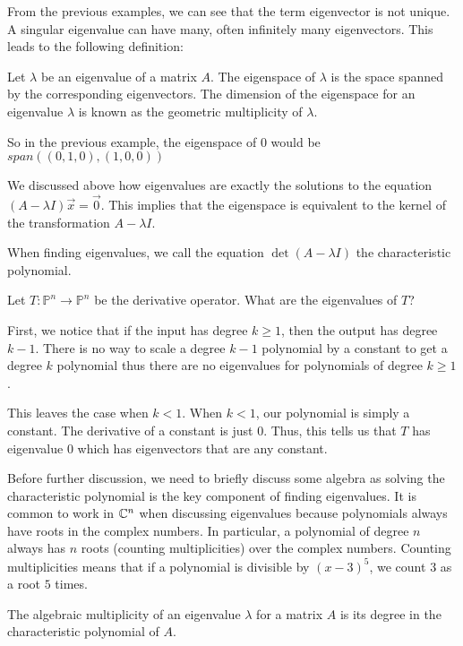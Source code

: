 From the previous examples, we can see that the term eigenvector is not unique. A singular eigenvalue can have many, often infinitely many eigenvectors. This leads to the following definition:
\begin{definition}
    Let $\lambda$ be an eigenvalue of a matrix $A$. The eigenspace of $\lambda$ is the space spanned by the corresponding eigenvectors. The dimension of the eigenspace for an eigenvalue $\lambda$ is known as the geometric multiplicity of $\lambda$.
\end{definition}
\begin{remark}
    So in the previous example, the eigenspace of $0$ would be $span({(0,1,0),(1,0,0)})$
\end{remark}
\begin{remark}
    We discussed above how eigenvalues are exactly the solutions to the equation $(A-\lambda I)\vec{x}=\vec{0}$. This implies that the eigenspace is equivalent to the kernel of the transformation $A-\lambda I$.
\end{remark}
\begin{definition}
    When finding eigenvalues, we call the equation $\det(A-\lambda I)$ the characteristic polynomial.
\end{definition}
\begin{example}
    Let $T: \mathbb{P}^n\to\mathbb{P}^n$ be the derivative operator. What are the eigenvalues of $T$?

    First, we notice that if the input has degree $k\geq 1$, then the output has degree $k-1$. There is no way to scale a degree $k-1$ polynomial by a constant to get a degree $k$ polynomial thus there are no eigenvalues for polynomials of degree $k\geq 1$.

    This leaves the case when $k<1$. When $k<1$, our polynomial is simply a constant. The derivative of a constant is just $0$. Thus, this tells us that $T$ has eigenvalue $0$ which has eigenvectors that are any constant.
\end{example}
Before further discussion, we need to briefly discuss some algebra as solving the characteristic polynomial is the key component of finding eigenvalues. It is common to work in $\mathbb{C}^n$ when discussing eigenvalues because polynomials always have roots in the complex numbers. In particular, a polynomial of degree $n$ always has $n$ roots (counting multiplicities) over the complex numbers. Counting multiplicities means that if a polynomial is divisible by $(x-3)^5$, we count $3$ as a root $5$ times.
\begin{definition}
    The algebraic multiplicity of an eigenvalue $\lambda$ for a matrix $A$ is its degree in the characteristic polynomial of $A$.
\end{definition}
